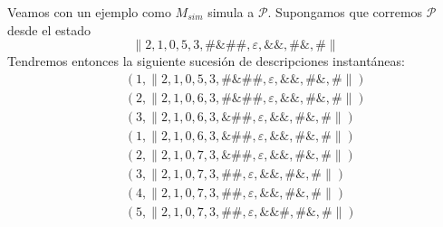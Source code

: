 \begin{frame}
  \PN Veamos con un ejemplo como $M_{sim}$ simula a $\mathcal{P}$. Supongamos que corremos $\mathcal{P}$ desde el estado
  \begin{equation*}
    \lVert 2, 1, 0, 5, 3, \#\&\#\#, \varepsilon, \&\&, \#\&, \# \rVert
  \end{equation*}
  \PN Tendremos entonces la siguiente sucesión de descripciones instantáneas:
  \begin{eqnarray*}
    && (1, \lVert 2, 1, 0, 5, 3, \#\&\#\#, \varepsilon, \&\&, \#\&, \# \rVert) \\[5pt]
    && (2, \lVert 2, 1, 0, 6, 3, \#\&\#\#, \varepsilon, \&\&, \#\&, \# \rVert) \\[5pt]
    && (3, \lVert 2, 1, 0, 6, 3, \&\#\#, \varepsilon, \&\&, \#\&, \# \rVert) \\[5pt]
    && (1, \lVert 2, 1, 0, 6, 3, \&\#\#, \varepsilon, \&\&, \#\&, \# \rVert) \\[5pt]
    && (2, \lVert 2, 1, 0, 7, 3, \&\#\#, \varepsilon, \&\&, \#\&, \# \rVert) \\[5pt]
    && (3, \lVert 2, 1, 0, 7, 3, \#\#, \varepsilon, \&\&, \#\&, \# \rVert) \\[5pt]
    && (4, \lVert 2, 1, 0, 7, 3, \#\#, \varepsilon, \&\&, \#\&, \# \rVert) \\[5pt]
    && (5, \lVert 2, 1, 0, 7, 3, \#\#, \varepsilon, \&\&\#, \#\&, \# \rVert)
  \end{eqnarray*}
\end{frame}
